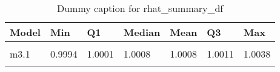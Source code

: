 \begin{table}
\centering
\caption{Dummy caption for rhat_summary_df}
\centering
\fontsize{10}{12}\selectfont
\begin{tabular}[t]{lllllll}
\toprule
Model & Min & Q1 & Median & Mean & Q3 & Max\\
\midrule
\cellcolor{gray!10}{m2} & \cellcolor{gray!10}{0.9994} & \cellcolor{gray!10}{0.9998} & \cellcolor{gray!10}{1.0004} & \cellcolor{gray!10}{1.0006} & \cellcolor{gray!10}{1.0016} & \cellcolor{gray!10}{1.0027}\\
m3.1 & 0.9994 & 1.0001 & 1.0008 & 1.0008 & 1.0011 & 1.0038\\
\cellcolor{gray!10}{m4} & \cellcolor{gray!10}{0.9992} & \cellcolor{gray!10}{0.9996} & \cellcolor{gray!10}{1.0003} & \cellcolor{gray!10}{1.0005} & \cellcolor{gray!10}{1.0013} & \cellcolor{gray!10}{1.0031}\\
\bottomrule
\end{tabular}
\end{table}

